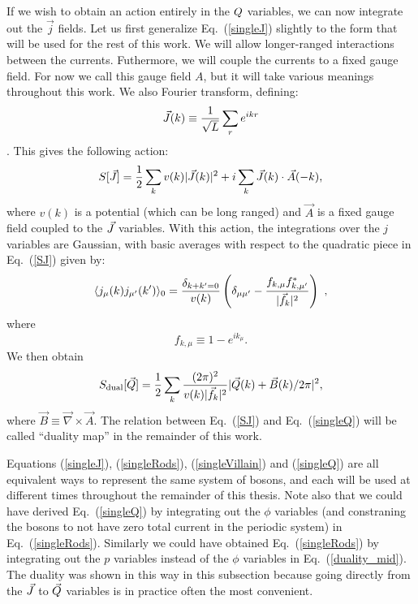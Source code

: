 If we wish to obtain an action entirely in the $Q$ variables, we can now integrate out the $\vec{j}$ fields. Let us first generalize Eq.~(\ref{singleJ}) slightly to the form that will be used for the rest of this work. We will allow longer-ranged interactions between the currents. Futhermore, we will couple the currents to a fixed gauge field. For now we call this gauge field $A$, but it will take various meanings throughout this work. We also Fourier transform, defining:
\begin{equation}
\vec{J}(k)\equiv \frac{1}{\sqrt{L}} \sum_r e^{ikr}
\end{equation}. 
This gives the following action:
\begin{eqnarray}
S[\vec{J}]=\frac{1}{2}\sum_{k} v(k) |\vec{J}(k)|^2 + i\sum_k  \vec{J}(k)\cdot \vec{A}(-k),
\label{SJ}
\end{eqnarray}
where $v(k)$ is a potential (which can be long ranged) and $\vec{A}$ is a fixed gauge field coupled to the $\vec{J}$ variables. 
With this action, the integrations over the $j$ variables are Gaussian, with basic averages with respect to the quadratic piece in Eq.~(\ref{SJ}) given by:
\begin{equation}
\langle j_\mu(k) j_{\mu'}(k') \rangle_0 = \frac{\delta_{k+k'=0}}{v(k)} \left(\delta_{\mu \mu'} - \frac{f_{k,\mu} f_{k,\mu'}^*}{|\vec{f}_k|^2} \right) ~,
\end{equation}
 where 
 \begin{equation}
 f_{k,\mu} \equiv 1 - e^{i k_\mu}.
 \end{equation}
  We then obtain
\begin{equation}
S_{\rm dual}[\vec{Q}] = \frac{1}{2} \sum_k \frac{(2\pi)^2}{v(k) |\vec{f}_k|^2} |\vec{Q}(k) + \vec{B}(k)/2\pi|^2,
\label{singleQ}
\end{equation}
where $\vec{B} \equiv \vec{\nabla} \times \vec{A}$.  The relation between Eq.~(\ref{SJ}) and Eq.~(\ref{singleQ}) will be called ``duality map'' in the remainder of this work. 

Equations (\ref{singleJ}), (\ref{singleRods}), (\ref{singleVillain}) and (\ref{singleQ}) are all equivalent ways to represent the same system of bosons, and each will be used at different times throughout the remainder of this thesis. Note also that we could have derived Eq.~(\ref{singleQ}) by integrating out the $\phi$ variables (and constraning the bosons to not have zero total current in the periodic system) in Eq.~(\ref{singleRods}). Similarly we could have obtained Eq.~(\ref{singleRods}) by integrating out the $p$ variables instead of the $\phi$ variables in Eq.~(\ref{duality_mid}). The duality was shown in this way in this subsection because going directly from the $\vec{J}$ to $\vec{Q}$ variables is in practice often the most convenient.


